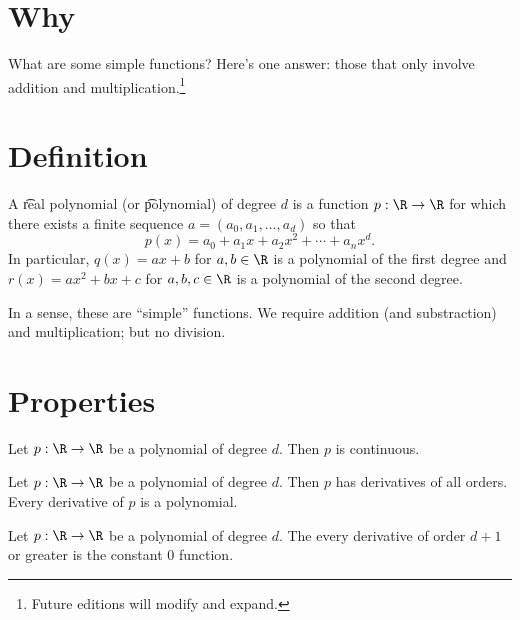 

\section*{Why}

What are some simple functions?
Here's one answer: those that only involve addition and multiplication.\footnote{Future editions will modify and expand.}

\section*{Definition}

A \t{real polynomial} (or \t{polynomial}) of degree $d$ is a function $p: \R  \to \R $ for which there exists a finite sequence $a = (a_0, a_1, \dots , a_d)$ so that
\[
p(x) = a_0 + a_1 x + a_2 x^2 + \cdots + a_nx^d.
\]
In particular, $q(x) = ax + b$ for $a, b \in \R $ is a polynomial of the first degree and $r(x) = ax^2 + bx + c$ for $a, b, c \in \R $ is a polynomial of the second degree.

In a sense, these are ``simple'' functions.
We require addition (and substraction) and multiplication; but no division.

\section*{Properties}

\begin{proposition}
Let $p: \R  \to \R $ be a polynomial of degree $d$.
Then $p$ is continuous.
\end{proposition}

\begin{proposition}
Let $p: \R  \to \R $ be a polynomial of degree $d$.
Then $p$ has derivatives of all orders.
Every derivative of $p$ is a polynomial.
\end{proposition}

\begin{proposition}
Let $p: \R  \to \R $ be a polynomial of degree $d$.
The every derivative of order $d+1$ or greater is the constant 0 function.
\end{proposition}

\blankpage
